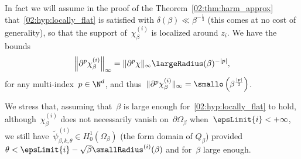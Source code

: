     In fact we will assume in the proof of the Theorem~\ref{02:thm:harm_approx} that~\eqref{02:hyp:locally_flat} is satisfied with $\delta(\beta)\ll \beta^{-\frac13}$ (this comes at no cost of generality), so that the support of~$\chi_\beta^{(i)}$ is localized around $z_i$.
    We have the bounds
    \begin{equation}
        \label{02:eq:linf_bound_nabla_chi}
        \left\|\partial^p\chi_\beta^{(i)}\right\|_\infty = \|\partial^p \chi\|_\infty \largeRadius(\beta)^{-|p|},
    \end{equation}
    for any multi-index~$p\in\N^d$, and thus~$\|\partial^p \chi_\beta^{(i)}\|_\infty = \smallo\left(\beta^{\frac{|p|}2}\right)$.
    
    We stress that, assuming that~$\beta$ is large enough for~\eqref{02:hyp:locally_flat} to hold, although~$\chi_\beta^{(i)}$ does not necessarily vanish on~$\partial \Omega_\beta$ when~$\epsLimit{i}<+\infty$, we still have~$\widetilde\psi_{\beta,k,\theta}^{(i)}\in H_0^1(\Omega_\beta)$ (the form domain of $Q_\beta$) provided~$\theta<\epsLimit{i} - \sqrt\beta\smallRadius^{(i)}(\beta)$ and for~$\beta$ large enough.
    
